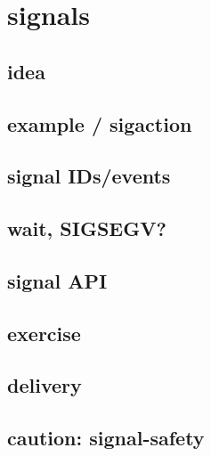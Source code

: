 
\section{signals}

\subsection{idea}



\subsection{example / sigaction}



\subsection{signal IDs/events}




\subsection{wait, SIGSEGV?}



\subsection{signal API}




\subsection{exercise}


\subsection{delivery}



\subsection{caution: signal-safety}

